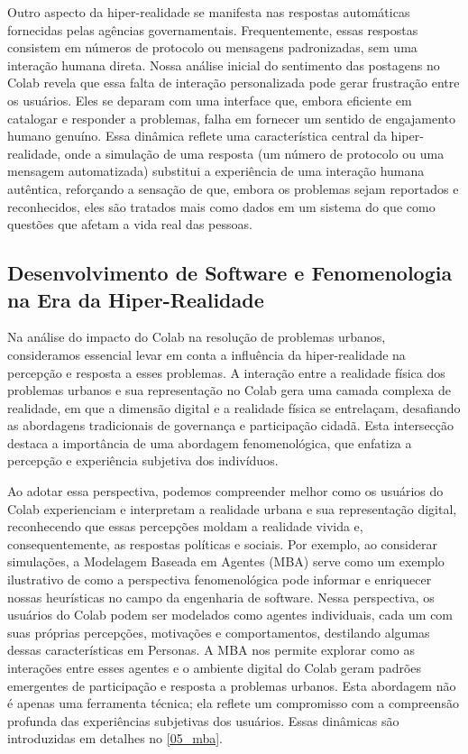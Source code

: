 Outro aspecto da hiper-realidade se manifesta nas respostas automáticas fornecidas pelas agências governamentais. Frequentemente, essas respostas consistem em números de protocolo ou mensagens padronizadas, sem uma interação humana direta. Nossa análise inicial do sentimento das postagens no Colab revela que essa falta de interação personalizada pode gerar frustração entre os usuários. Eles se deparam com uma interface que, embora eficiente em catalogar e responder a problemas, falha em fornecer um sentido de engajamento humano genuíno. Essa dinâmica reflete uma característica central da hiper-realidade, onde a simulação de uma resposta (um número de protocolo ou uma mensagem automatizada) substitui a experiência de uma interação humana autêntica, reforçando a sensação de que, embora os problemas sejam reportados e reconhecidos, eles são tratados mais como dados em um sistema do que como questões que afetam a vida real das pessoas.

\subsection*{Desenvolvimento de Software e Fenomenologia na Era da Hiper-Realidade}

Na análise do impacto do Colab na resolução de problemas urbanos, consideramos essencial levar em conta a influência da hiper-realidade na percepção e resposta a esses problemas. A interação entre a realidade física dos problemas urbanos e sua representação no Colab gera uma camada complexa de realidade, em que a dimensão digital e a realidade física se entrelaçam, desafiando as abordagens tradicionais de governança e participação cidadã. Esta intersecção destaca a importância de uma abordagem fenomenológica, que enfatiza a percepção e experiência subjetiva dos indivíduos.

Ao adotar essa perspectiva, podemos compreender melhor como os usuários do Colab experienciam e interpretam a realidade urbana e sua representação digital, reconhecendo que essas percepções moldam a realidade vivida e, consequentemente, as respostas políticas e sociais. Por exemplo, ao considerar simulações, a Modelagem Baseada em Agentes (MBA) serve como um exemplo ilustrativo de como a perspectiva fenomenológica pode informar e enriquecer nossas heurísticas no campo da engenharia de software. Nessa perspectiva, os usuários do Colab podem ser modelados como agentes individuais, cada um com suas próprias percepções, motivações e comportamentos, destilando algumas dessas características em Personas. A MBA nos permite explorar como as interações entre esses agentes e o ambiente digital do Colab geram padrões emergentes de participação e resposta a problemas urbanos. Esta abordagem não é apenas uma ferramenta técnica; ela reflete um compromisso com a compreensão profunda das experiências subjetivas dos usuários. Essas dinâmicas são introduzidas em detalhes no \autoref{05_mba}.

